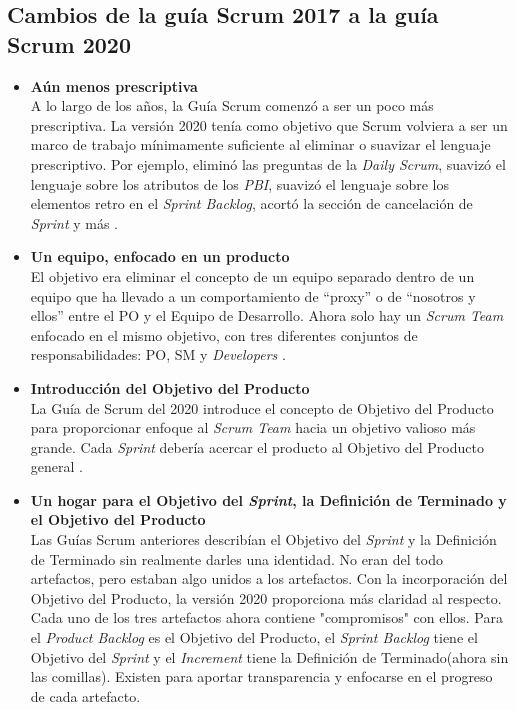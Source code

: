 \begin{spacing}{1.5}
	\subsection{Cambios de la gu\'{i}a Scrum 2017 a la gu\'{i}a Scrum 2020}
		\begin{itemize}
			\item \textbf{Aún menos prescriptiva}\\
			A lo largo de los años, la Guía Scrum comenzó a ser un poco más prescriptiva. La versión 2020 tenía como objetivo que Scrum volviera a ser un marco de trabajo mínimamente suficiente al eliminar o suavizar el lenguaje prescriptivo. Por ejemplo, eliminó las preguntas de la \textit{Daily Scrum}, suavizó el lenguaje sobre los atributos de los \textit{PBI}, suavizó el lenguaje sobre los elementos retro en el \textit{Sprint Backlog}, acortó la sección de cancelación de \textit{Sprint} y más \cite{chap2_scrum}.
			\item \textbf{Un equipo, enfocado en un producto}\\
			El objetivo era eliminar el concepto de un equipo separado dentro de un equipo que ha llevado a un
			comportamiento de ``proxy'' o de ``nosotros y ellos'' entre el PO y el Equipo de Desarrollo. Ahora solo hay	un \textit{Scrum Team} enfocado en el mismo objetivo, con tres diferentes conjuntos de responsabilidades: PO, SM y \textit{Developers} \cite{chap2_scrum}.
			\item \textbf{Introducción del Objetivo del Producto}\\
			La Guía de Scrum del 2020 introduce el concepto de Objetivo del Producto para proporcionar enfoque al \textit{Scrum Team} hacia un objetivo valioso más grande. Cada \textit{Sprint} debería acercar el producto al Objetivo del Producto general \cite{chap2_scrum}.
			\item \textbf{Un hogar para el Objetivo del \textit{Sprint}, la Definición de Terminado y el Objetivo del Producto}\\
			Las Guías Scrum anteriores describían el Objetivo del \textit{Sprint} y la Definición de Terminado sin realmente darles una identidad. No eran del todo artefactos, pero estaban algo unidos a los artefactos. Con la incorporación del Objetivo del Producto, la versión 2020 proporciona más claridad al respecto. Cada uno de los tres artefactos ahora contiene "compromisos" con ellos. Para el \textit{Product Backlog} es el Objetivo del Producto, el \textit{Sprint Backlog} tiene el Objetivo del \textit{Sprint} y el \textit{Increment} tiene la Definición de Terminado(ahora sin las comillas). Existen para aportar transparencia y enfocarse en el progreso de cada artefacto\cite{chap2_scrum}.

\end{itemize}
\end{spacing}
